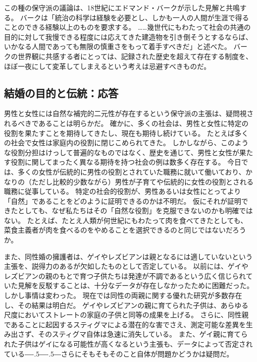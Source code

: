 \documentclass[paper=a4,book,openany]{jlreq}
\def\DDASH{―\kern-.5\zw―\kern-.5\zw―}
\begin{document}
この種の保守派の議論は、18世紀にエドマンド・バークが示した見解と共鳴する。
バークは「統治の科学は経験を必要とし、しかも一人の人間が生涯で得ることのできる経験以上のものを要求する。
……幾世代にもわたって社会の共通の目的に対して我慢できる程度には応えてきた建造物を引き倒そうとするならば、いかなる人間であっても無限の慎重さをもって着手すべきだ」と述べた\citep[p.53]{burke87:_reflec_revol_franc}。
バークの世界観に共感する者にとっては、記録された歴史を超えて存在する制度を、ほぼ一夜にして変革してしまえるという考えは忌避すべきものだ。

\subsection{結婚の目的と伝統：応答}

男性と女性には自然な補完的二元性が存在するという保守派の主張は、疑問視されるべきであることは明らかだ。
確かに、多くの社会は、男性と女性に特定の役割を果たすことを期待してきたし、現在も期待し続けている。
たとえば多くの社会で女性は家庭内の役割に閉じこめられてきた。
しかしながら、このような役割分担はけっして普遍的なものではなく、歴史を通じて、男性と女性が果たす役割に関してまったく異なる期待を持つ社会の例は数多く存在する。
今日では、多くの女性が伝統的に男性の役割とされていた職務に就いて働いており、かなりの（ただし比較的少数ながら）男性が子育てや伝統的に女性の役割とされる職務に従事している。
特定の社会的役割が、男性あるいは女性にとってより「自然」であることをどのように証明できるのかは不明だ。
仮にそれが証明できたとしても、なぜ私たちはその「自然な役割」を克服できないのかも明確ではない。
たとえば、たとえ人類が何世紀にもわたって肉を食べてきたとしても、菜食主義者が肉を食べるのをやめることを選択できるのと同じではないだろうか。

また、同性婚の擁護者は、ゲイやレズビアンは親となるには適していないという主張を、説得力のあるが欠如したものとして否定している。
以前には、ゲイやレズビアンの親のもとで育つ子供たちは発達が不調であるという広く信じられていた見解を反駁することは、十分なデータが存在しなかったために困難だった。
しかし事情は変わった。
現在では同性の両親に関する優れた研究が多数存在し、その結果は明白だ。
ゲイやレズビアンの親に育てられた子供は、あらゆる尺度においてストレートの家庭の子供と同等の成果を上げる。
さらに、同性親であることに起因するスティグマによる潜在的な害でさえ、測定可能な差異を生み出さず、そのスティグマ自体は急速に消失している\citep{calzo17:_paren_sexual_orien_child_psych_well_being,biblarz10:_how_does_gender_paren_matter}。
また、ゲイ親に育てられた子供はゲイになる可能性が高くなるという主張も、データによって否定されている{\DDASH}さらにそもそもそのこと自体が問題かどうかは疑問だ。
\end{document}
